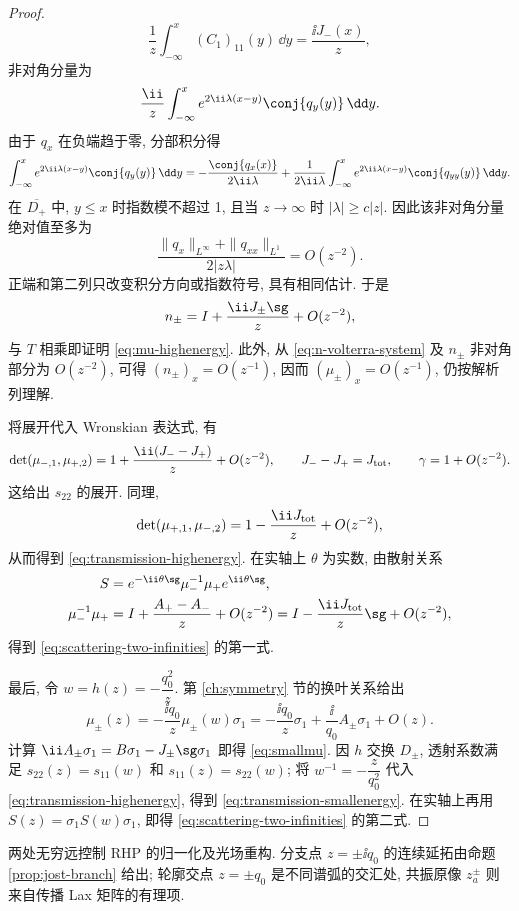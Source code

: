 \begin{proof}
\[
\dfrac{1}{z}\int_{-\infty}^{x}( C_1)_{11}(y)\,\dd y
=\dfrac{\ii J_-(x)}{z},
\]
非对角分量为
\[
\dfrac{\ii}{z}\int_{-\infty}^{x}e^{2\ii\lambda(x-y)}\conj{q_y(y)}\,\dd y.
\]
由于 $q_x$ 在负端趋于零, 分部积分得
\[
\int_{-\infty}^{x}e^{2\ii\lambda(x-y)}\conj{q_y(y)}\,\dd y
=-\dfrac{\conj{q_x(x)}}{2\ii\lambda}
+\dfrac{1}{2\ii\lambda}\int_{-\infty}^{x}e^{2\ii\lambda(x-y)}\conj{q_{yy}(y)}\,\dd y.
\]
在 $\overline{D_+}$ 中, $y\le x$ 时指数模不超过 1, 且当 $z\to\infty$ 时 $|\lambda|\ge c|z|$. 因此该非对角分量绝对值至多为
\[
\dfrac{\|q_x\|_{L^\infty}+\|q_{xx}\|_{L^1}}{2|z\lambda|}=O(z^{-2}).
\]
正端和第二列只改变积分方向或指数符号, 具有相同估计. 于是
\[
n_\pm=I+\dfrac{\ii J_\pm\sg}{z}+O(z^{-2}),
\]
与 $ T$ 相乘即证明 \eqref{eq:mu-highenergy}. 此外, 从 \eqref{eq:n-volterra-system} 及 $n_\pm$ 非对角部分为 $O(z^{-2})$, 可得 $(n_\pm)_x=O(z^{-1})$, 因而 $(\mu_\pm)_x=O(z^{-1})$, 仍按解析列理解.

将展开代入 Wronskian 表达式, 有
\[
\det(\mu_{-,1},\mu_{+,2})
=1+\dfrac{\ii(J_--J_+)}{z}+O(z^{-2}),\qquad
J_--J_+=J_{\rm tot},\qquad \gamma=1+O(z^{-2}).
\]
这给出 $s_{22}$ 的展开. 同理,
\[
\det(\mu_{+,1},\mu_{-,2})
=1-\dfrac{\ii J_{\rm tot}}{z}+O(z^{-2}),
\]
从而得到 \eqref{eq:transmission-highenergy}. 在实轴上 $\theta$ 为实数, 由散射关系
\[
\begin{aligned}
S&=e^{-\ii\theta\sg}\mu_-^{-1}\mu_+e^{\ii\theta\sg},\\
\mu_-^{-1}\mu_+&=I+\dfrac{A_+-A_-}{z}+O(z^{-2})
=I-\dfrac{\ii J_{\rm tot}}{z}\sg+O(z^{-2}),
\end{aligned}
\]
得到 \eqref{eq:scattering-two-infinities} 的第一式.

最后, 令 $w=h(z)=-\dfrac{q_0^2}{z}$. 第 \ref{ch:symmetry} 节的换叶关系给出
\[
\mu_\pm(z)=-\dfrac{\ii q_0}{z}\mu_\pm(w)\sigma_1
=-\dfrac{\ii q_0}{z}\sigma_1+\dfrac{\ii}{q_0}A_\pm\sigma_1+O(z).
\]
计算 $\ii A_\pm\sigma_1=B\sigma_1-J_\pm\sg\sigma_1$ 即得 \eqref{eq:smallmu}. 因 $h$ 交换 $D_\pm$, 透射系数满足 $s_{22}(z)=s_{11}(w)$ 和 $s_{11}(z)=s_{22}(w)$; 将 $w^{-1}=-\dfrac{z}{q_0^2}$ 代入 \eqref{eq:transmission-highenergy}, 得到 \eqref{eq:transmission-smallenergy}. 在实轴上再用 $S(z)=\sigma_1S(w)\sigma_1$, 即得 \eqref{eq:scattering-two-infinities} 的第二式.
\end{proof}

两处无穷远控制 RHP 的归一化及光场重构. 分支点 $z=\pm\ii q_0$ 的连续延拓由命题 \ref{prop:jost-branch} 给出; 轮廓交点 $z=\pm q_0$ 是不同谱弧的交汇处, 共振原像 $z_a^\pm$ 则来自传播 Lax 矩阵的有理项.
